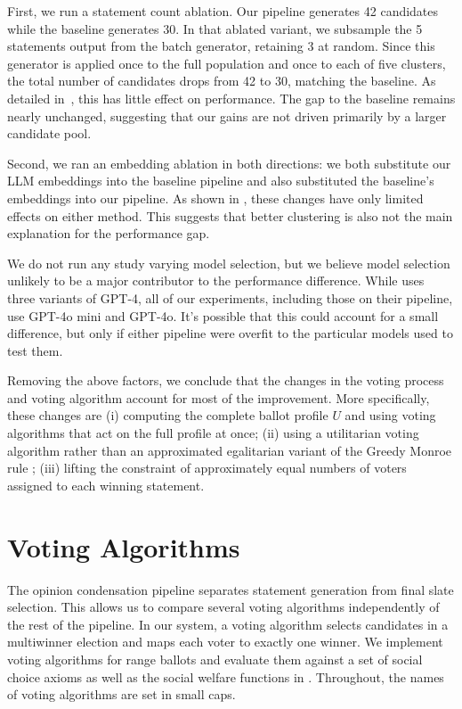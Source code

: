 \documentclass[11pt]{article}
\begin{document}
First, we run a statement count ablation. Our pipeline generates 42 candidates while the baseline generates 30. In that ablated variant, we subsample the 5 statements output from the batch generator, retaining 3 at random. Since this generator is applied once to the full population and once to each of five clusters, the total number of candidates drops from 42 to 30, matching the baseline. As detailed in~, this has little effect on performance. The gap to the baseline remains nearly unchanged, suggesting that our gains are not driven primarily by a larger candidate pool.

Second, we ran an embedding ablation in both directions: we both substitute our LLM embeddings into the baseline pipeline and also substituted the baseline's embeddings into our pipeline. As shown in , these changes have only limited effects on either method. This suggests that better clustering is also not the main explanation for the performance gap.

We do not run any study varying model selection, but we believe model selection unlikely to be a major contributor to the performance difference. While \citet{fish-v2} uses three variants of GPT-4, all of our experiments, including those on their pipeline, use GPT-4o mini and GPT-4o.  It's possible that this could account for a small difference, but only if either pipeline were overfit to the particular models used to test them.

Removing the above factors, we conclude that the changes in the voting process and voting algorithm account for most of the improvement. More specifically, these changes are (i) computing the complete ballot profile $U$ and using voting algorithms that act on the full profile at once; (ii) using a utilitarian voting algorithm rather than an approximated egalitarian variant of the Greedy Monroe rule \citep{skowron-2015}; (iii) lifting the constraint of approximately equal numbers of voters assigned to each winning statement. 

\section{Voting Algorithms}
\label{sec:voting-algorithms}

The opinion condensation pipeline separates statement generation from final slate selection. This allows us to compare several voting algorithms independently of the rest of the pipeline. In our system, a voting algorithm selects candidates in a multiwinner election and maps each voter to exactly one winner. We implement voting algorithms for range ballots and
evaluate them against a set of social choice axioms as well as the social welfare functions in . Throughout, the names of voting algorithms are set in small caps.
\end{document}
